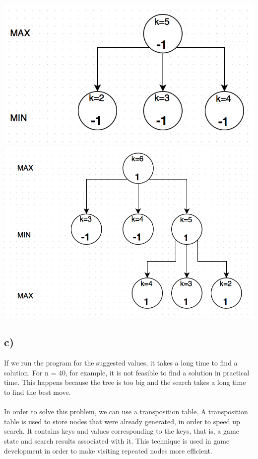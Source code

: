 \documentclass{article}
\begin{document}
\includegraphics[width=\textwidth]{k=5}
\includegraphics[width=\textwidth]{k=6}

\subsection*{c)}
If we run the program for the suggested values, it takes a long time to find a solution. For n = 40, for example, it is not feasible to find a solution in practical time. This happens because the tree is too big and the search takes a long time to find the best move.

\paragraph{}In order to solve this problem, we can use a transposition table. A transposition table is used to store nodes that were already generated, in order to speed up search. It contains keys and values corresponding to the keys, that is, a game state and search results associated with it. This technique is used in game development in order to make visiting repeated nodes more efficient.
\end{document}
